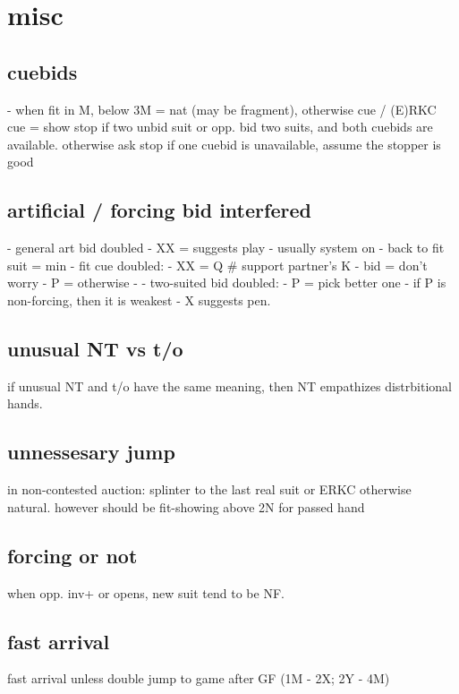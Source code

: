 \section{misc}

\subsection{cuebids}

- when fit in M, below 3M = nat (may be fragment), otherwise cue / (E)RKC
cue = show stop if two unbid suit or opp. bid two suits, and both cuebids are available.
    otherwise ask stop
    if one cuebid is unavailable, assume the stopper is good

\subsection{artificial / forcing bid interfered}

- general art bid doubled
    - XX = suggests play
    - usually system on 
    - back to fit suit = min
- fit cue doubled:
    - XX = Q  \# support partner's K
    - bid = don't worry
    - P = otherwise
- 
- two-suited bid doubled:
    - P = pick better one
- if P is non-forcing, then it is weakest 
- X suggests pen.

\subsection{unusual NT vs t/o}

if unusual NT and t/o have the same meaning, then NT empathizes distrbitional hands.


\subsection{unnessesary jump}

in non-contested auction: splinter to the last real suit or ERKC
otherwise natural. however should be fit-showing above 2N for passed hand

\subsection{forcing or not}

when opp. inv+ or opens, new suit tend to be NF.

\subsection{fast arrival}

fast arrival unless double jump to game after GF (1M - 2X; 2Y - 4M)

